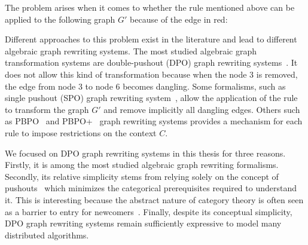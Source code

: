 The problem arises when it comes to whether the rule mentioned above can be applied to the following graph $G'$ because of the edge in red:
\begin{center}
\end{center}
Different approaches to this problem exist in the literature and lead to different algebraic graph rewriting systems.   
The most studied algebraic graph transformation systems are double-pushout (DPO) graph rewriting systems~\cite{corradini1997algebraic,habel2001double}. It does not allow this kind of transformation because when the node 3 is removed, the edge from node 3 to node 6 becomes dangling. Some formalisms, such as single pushout (SPO) graph rewriting system~\cite{ehrig1997algebraic}, allow the application of the rule to transform the graph $G'$ and remove implicitly all dangling edges. Others such as PBPO~\cite{corradini2019thepbpo} and PBPO+~\cite{overbeek2023graph} graph rewriting systems provides a mechanism for each rule to impose restrictions on the context $C$. 

   We focused on DPO graph rewriting systems in this thesis for three reasons.
   Firstly, it is among the most studied algebraic graph rewriting formalisms.
   Secondly, its relative simplicity stems from relying solely on the concept of pushouts~\cite{pierce1991basic} which minimizes the categorical prerequisites required to understand it. This is interesting because the abstract nature of category theory is often seen as a barrier to entry for newcomers~\cite{overbeekthesis}.
    Finally, despite its conceptual simplicity, DPO graph rewriting systems remain sufficiently expressive to model many distributed algorithms.

